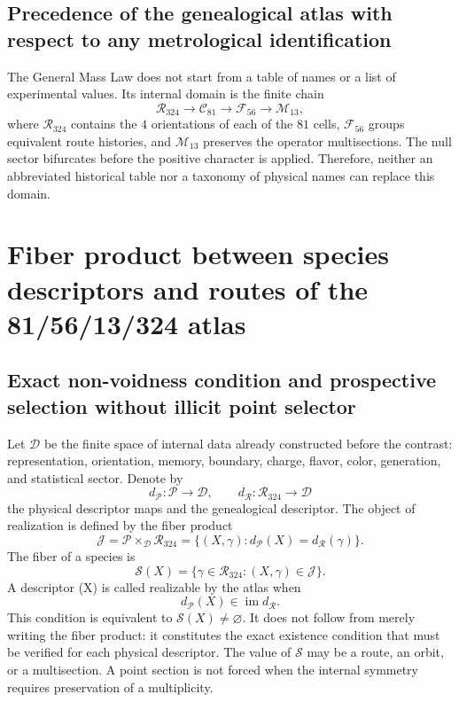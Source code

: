 \subsection{Precedence of the genealogical atlas with respect to any metrological identification}

The General Mass Law does not start from a table of names or a list of
experimental values. Its internal domain is the finite chain
\[
 \mathcal R_{324}\longrightarrow \mathcal C_{81}
 \longrightarrow \mathcal F_{56}\longrightarrow \mathcal M_{13},
\]
where \(\mathcal R_{324}\) contains the \(4\) orientations of each of the
\(81\) cells, \(\mathcal F_{56}\) groups equivalent route histories, and
\(\mathcal M_{13}\) preserves the operator multisections. The null sector
bifurcates before the positive character is applied. Therefore, neither an
abbreviated historical table nor a taxonomy of physical names can replace this
domain.

\section{Fiber product between species descriptors and routes of the 81/56/13/324 atlas}

\subsection{Exact non-voidness condition and prospective selection without illicit point selector}

Let \(\mathcal D\) be the finite space of internal data already constructed before the
contrast: representation, orientation, memory, boundary, charge, flavor,
color, generation, and statistical sector. Denote by
\[
 d_{\mathcal P}:\mathcal P\longrightarrow\mathcal D,
 \qquad
 d_{\mathcal R}:\mathcal R_{324}\longrightarrow\mathcal D
\]
the physical descriptor maps and the genealogical descriptor. The object
of realization is defined by the fiber product
\[
 \mathcal J
 =\mathcal P\times_{\mathcal D}\mathcal R_{324}
 =\{(X,\gamma):d_{\mathcal P}(X)=d_{\mathcal R}(\gamma)\}.
\]
The fiber of a species is
\[
\mathscr S(X)=\{\gamma\in\mathcal R_{324}:(X,\gamma)\in\mathcal J\}.
\]
A descriptor (X) is called realizable by the atlas when
\[
 d_{\mathcal P}(X)\in\operatorname{im}d_{\mathcal R}.
\]
This condition is equivalent to \(\mathscr S(X)\ne\varnothing\). It does not follow from merely writing the fiber product: it constitutes the exact existence condition that must be verified for each physical descriptor. The value of \(\mathscr S\) may be a route, an orbit, or a multisection. A point section is not forced when the internal symmetry requires preservation of a multiplicity.

